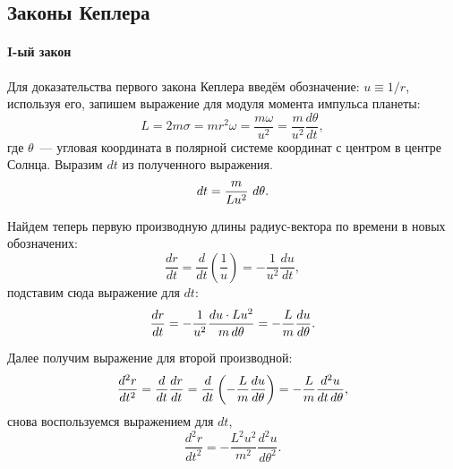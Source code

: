 \subsection{Законы Кеплера}
\paragraph{I-ый закон} 

Для доказательства первого закона Кеплера введём обозначение: $u \equiv 1/r$, используя его, запишем выражение для модуля момента импульса планеты:
\begin{equation*}
	L = 2 m \sigma = m r^2 \omega = \frac{m \omega}{u^2} = \frac{m}{u^2} \frac{d \theta}{d t},
\end{equation*}
где $\theta$~--- угловая координата в полярной системе координат с центром в центре Солнца.
Выразим $dt$ из полученного выражения.
\begin{equation*}
	dt = \frac{m}{L u^2} \, \,d\theta.
\end{equation*}

Найдем теперь первую производную длины радиус-вектора по времени в новых обозначених:
\begin{equation*}
	\frac{d r}{d t} = \frac{d}{d t} \left( \frac{1}{u} \right) = - \frac{1}{u^2} \frac{du}{dt},
\end{equation*}
подставим сюда выражение для $dt$:
\begin{equation*}
	\frac{d r}{d t} = - \frac{1}{u^2} \frac{du \cdot L u^2}{m \,d\theta} = - \frac{L}{m} \frac{d u}{d \theta}.
\end{equation*}

Далее получим выражение для второй производной:
\begin{equation*}
	\frac{d^2 r}{dt^2} = \frac{d}{dt} \frac{d r}{d t} = \frac{d}{dt} \left( - \frac{L}{m} \frac{d u}{d \theta} \right) = -\frac{L}{m} \frac{d^2 u}{dt \,d \theta},
\end{equation*}
снова воспользуемся выражением для $dt$,
\begin{equation*}
	\frac{d^2 r}{dt^2} = - \frac{L^2	 u^2}{m^2} \frac{d^2 u}{d \theta^2}.
\end{equation*}

